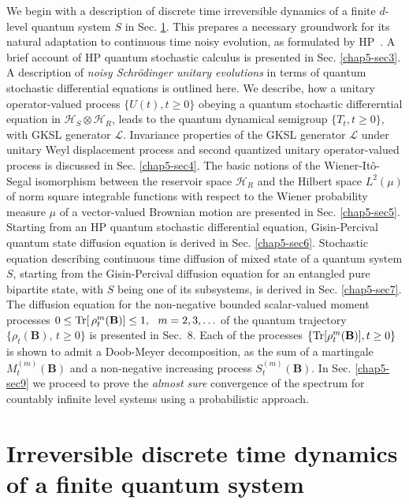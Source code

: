 We begin with a description of discrete time irreversible dynamics of a finite $d$-level quantum system $S$ in Sec. \ref{chap5-sec2}. This  prepares a necessary groundwork for its natural adaptation to  continuous time noisy evolution, as formulated by HP~\cite{key7,key8}. A brief account of HP quantum stochastic calculus is presented in Sec. \ref{chap5-sec3}. A description of  {\it noisy Schr{\"o}dinger unitary evolutions} in terms of quantum stochastic differential equations is outlined here. We describe,  how a   unitary operator-valued process $\{U(t), t\geq 0\}$ obeying a quantum stochastic differerntial equation  in $\mathcal{H}_S\otimes \mathcal{H}_R$, leads to  the quantum dynamical semigroup $\{T_t, t\geq 0\}$, with GKSL generator $\mathcal{L}$.  Invariance  properties of the GKSL generator $\mathcal{L}$ under  unitary Weyl displacement process and second quantized  unitary operator-valued process is discussed  in Sec. \ref{chap5-sec4}. The basic notions of the Wiener-It{\^o}-Segal isomorphism between the reservoir space $\mathcal{H}_R$ and the Hilbert space $L^2(\mu)$ of norm square integrable functions with respect to the Wiener probability measure $\mu$ of a vector-valued Brownian motion are presented in Sec. \ref{chap5-sec5}. Starting from an HP quantum stochastic differential equation,  Gisin-Percival~\cite{Gisin} quantum state diffusion equation is derived in Sec. \ref{chap5-sec6}.  Stochastic equation describing continuous time diffusion of mixed state of a quantum system $S$, starting from the Gisin-Percival diffusion equation for an entangled pure bipartite state, with $S$ being one of its subsystems, is derived in Sec. \ref{chap5-sec7}. The diffusion equation for  the non-negative bounded scalar-valued  moment processes  $0\leq {\rm Tr}[\, \rho_t^m(\mathbf{B})]\leq 1,\ \  m=2,3,\ldots$ of the quantum trajectory $\{\rho_t(\mathbf{B}),\, t\geq 0\}$ is presented in Sec.~8. Each of the processes $\{{\rm Tr}[\rho_t^m( \mathbf{B})], t\geq 0\}$ is shown to admit a Doob-Meyer decomposition,  as the sum of a martingale $M^{(m)}_t(\mathbf{B})$ and a non-negative increasing process $S^{(m)}_t(\mathbf{B})$. In Sec. \ref{chap5-sec9} we proceed to prove the {\em almost sure} convergence of the spectrum for countably infinite level systems using a probabilistic approach.   

\section{ Irreversible discrete time dynamics of a finite quantum system}\label{chap5-sec2}

